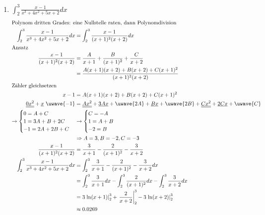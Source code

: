 \documentclass[11pt, a4paper]{article}
\begin{document}
\begin{enumerate}
	\item $\int_2^3 \frac{x-1}{x^3 + 4x^2 + 5x + 2} dx$ %
	\begin{align*}
		\shortintertext{Polynom dritten Grades: eine Nullstelle raten, dann Polynomdivision}
		\int_2^3 \frac{x-1}{x^3 + 4x^2 + 5x + 2} dx &= \int_2^3 \frac{x-1}{(x+1)^2 (x+2)} dx \\
		\shortintertext{Ansatz}
		\frac{x-1}{(x+1)^2 (x+2)} &= \frac{A}{x+1} + \frac{B}{(x+1)^2} + \frac{C}{x+2} \\
		&= \frac{A(x+1)(x+2) + B(x+2) + C(x+1)^2}{(x+1)^2 (x+2)} \\
		\shortintertext{Zähler gleichsetzen}
		x-1 &= A(x+1)(x+2) + B(x+2) + C(x+1)^2 \\
		\underline{\underline{0x^2}} + \underline{x} \ \uwave{- 1} &=
		\underline{\underline{Ax^2}} + \underline{3Ax} + \uwave{2A} + \underline{Bx} + \uwave{2B} + \underline{\underline{Cx^2}} + \underline{2Cx} + \uwave{C} \\
		\rightarrow \begin{cases}
			0 = A + C \\
			1 = 3A + B + 2C \\
			-1 = 2A + 2B + C
		\end{cases}
		&\rightarrow \begin{cases}
			C = -A \\
			1 = A + B \\
			-2 = B
		\end{cases} \\
		&\Rightarrow A=3, B=-2, C=-3 \\
		\frac{x-1}{(x+1)^2 (x+2)} &= \frac{3}{x+1} - \frac{2}{(x+1)^2} - \frac{3}{x+2} \\
		\int_2^3 \frac{x-1}{x^3 + 4x^2 + 5x + 2} dx &= \int_2^3 \frac{3}{x+1} - \frac{2}{(x+1)^2} - \frac{3}{x+2} dx \\
		&= \int_2^3 \frac{3}{x+1} dx - \int_2^3 \frac{2}{(x+1)^2} dx - \int_2^3 \frac{3}{x+2} dx \\
		&= 3 \left. \ln(x+1) \right|_2^3 + \left. \frac{2}{x+2} \right|_2^3 - 3 \left. \ln(x+2) \right|_2^3 \\
		&\approx 0.0269
	\end{align*}
\end{enumerate}
\end{document}
